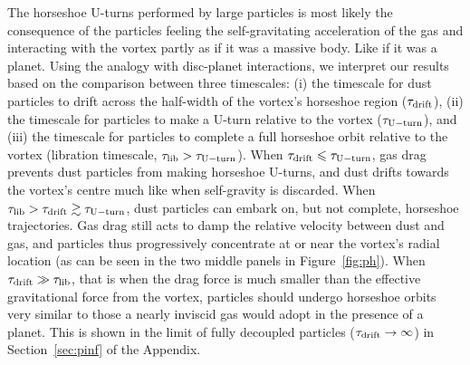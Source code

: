 \documentclass[a4paper,usenatbib]{mnras}
\begin{document}
The horseshoe U-turns performed by large particles is most likely the
consequence of the particles feeling the self-gravitating acceleration
of the gas and interacting with the vortex partly as if it was a
massive body. Like if it was a planet. Using the analogy with
disc-planet interactions, we interpret our results based on the
comparison between three timescales: (i) the timescale for dust
particles to drift across the half-width of the vortex's horseshoe
region ($\tau_{\rm drift}$), (ii) the timescale for particles to make
a U-turn relative to the vortex ($\tau_{\rm U-turn}$), and (iii) the
timescale for particles to complete a full horseshoe orbit relative to
the vortex (libration timescale, $\tau_{\rm lib} >
  \tau_{\rm U-turn}$). When $\tau_{\rm drift} \leq \tau_{\rm
  U-turn}$, gas drag prevents dust particles from making horseshoe
U-turns, and dust drifts towards the vortex's centre much like when
self-gravity is discarded. When $\tau_{\rm lib} > \tau_{\rm drift} 
\gtrsim \tau_{\rm U-turn}$, dust particles can
embark on, but not complete, horseshoe
trajectories. Gas drag still acts to damp the relative velocity
between dust and gas, and particles thus progressively concentrate at
or near the vortex's radial location (as can be seen in the two middle
panels in Figure~\ref{fig:ph}). When $\tau_{\rm drift} \gg \tau_{\rm
  lib}$, that is when the drag force is much smaller than the
effective gravitational force from the vortex, particles should
undergo horseshoe orbits very similar to those a nearly inviscid gas
would adopt in the presence of a planet. This is shown in the limit of
fully decoupled particles ($\tau_{\rm drift} \rightarrow \infty$) in
Section~\ref{sec:pinf} of the Appendix.
\end{document}
